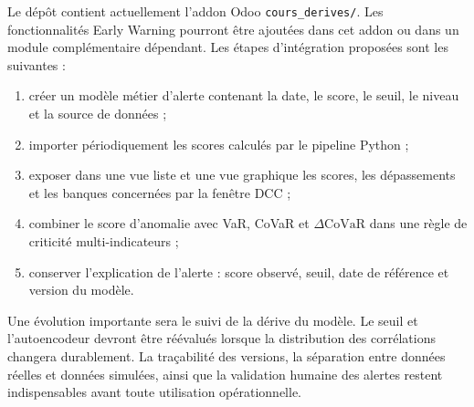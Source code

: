 \documentclass[12pt,a4paper]{article}
\begin{document}
Le dépôt contient actuellement l'addon Odoo \texttt{cours\_derives/}. Les fonctionnalités Early
Warning pourront être ajoutées dans cet addon ou dans un module complémentaire dépendant. Les
étapes d'intégration proposées sont les suivantes :
\begin{enumerate}
  \item créer un modèle métier d'alerte contenant la date, le score, le seuil, le niveau et la
        source de données ;
  \item importer périodiquement les scores calculés par le pipeline Python ;
  \item exposer dans une vue liste et une vue graphique les scores, les dépassements et les
        banques concernées par la fenêtre DCC ;
  \item combiner le score d'anomalie avec VaR, CoVaR et $\Delta\mathrm{CoVaR}$ dans une règle de
        criticité multi-indicateurs ;
  \item conserver l'explication de l'alerte : score observé, seuil, date de référence et
        version du modèle.
\end{enumerate}

Une évolution importante sera le suivi de la dérive du modèle. Le seuil et l'autoencodeur
devront être réévalués lorsque la distribution des corrélations changera durablement. La
traçabilité des versions, la séparation entre données réelles et données simulées, ainsi que la
validation humaine des alertes restent indispensables avant toute utilisation opérationnelle.
\end{document}

